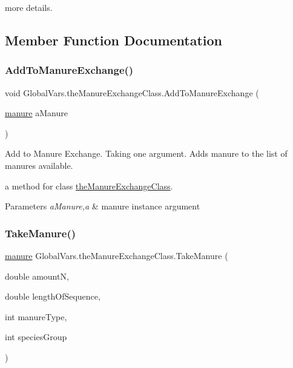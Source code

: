 more details. 

\subsection{Member Function Documentation}
\mbox{\label{class_global_vars_1_1the_manure_exchange_class_aa73016736e7fb5158a6317c9e0e8304f}} 
\subsubsection{\texorpdfstring{AddToManureExchange()}{AddToManureExchange()}}
{\footnotesize\ttfamily void Global\+Vars.\+the\+Manure\+Exchange\+Class.\+Add\+To\+Manure\+Exchange (\begin{DoxyParamCaption}\item[{\mbox{\hyperlink{classmanure}{manure}}}]{a\+Manure }\end{DoxyParamCaption})\hspace{0.3cm}{\ttfamily [inline]}}



Add to Manure Exchange. Taking one argument. Adds manure to the list of manures available. 

a method for class \mbox{\hyperlink{class_global_vars_1_1the_manure_exchange_class}{the\+Manure\+Exchange\+Class}}. 
\begin{DoxyParams}{Parameters}
{\em a\+Manure,a} & manure instance argument \\
\hline
\end{DoxyParams}
\mbox{\label{class_global_vars_1_1the_manure_exchange_class_a0bf102dc17ba51eb5874fef24bc979bc}} 
\subsubsection{\texorpdfstring{TakeManure()}{TakeManure()}}
{\footnotesize\ttfamily \mbox{\hyperlink{classmanure}{manure}} Global\+Vars.\+the\+Manure\+Exchange\+Class.\+Take\+Manure (\begin{DoxyParamCaption}\item[{double}]{amountN,  }\item[{double}]{length\+Of\+Sequence,  }\item[{int}]{manure\+Type,  }\item[{int}]{species\+Group }\end{DoxyParamCaption})\hspace{0.3cm}{\ttfamily [inline]}}



